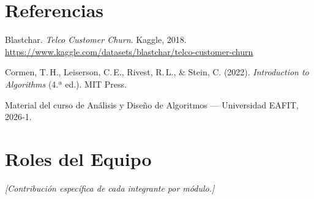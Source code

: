 \documentclass[12pt, a4paper]{article}
\begin{document}
\section{Referencias}

\begin{enumerate}[label={[\arabic*]}]
  \item Blastchar. \textit{Telco Customer Churn}. Kaggle, 2018.
        \url{https://www.kaggle.com/datasets/blastchar/telco-customer-churn}
  \item Cormen, T.\,H., Leiserson, C.\,E., Rivest, R.\,L., \& Stein, C. (2022).
        \textit{Introduction to Algorithms} (4.ª ed.). MIT Press.
  \item Material del curso de Análisis y Diseño de Algoritmos — Universidad EAFIT, 2026-1.
\end{enumerate}

\section{Roles del Equipo}
\textit{[Contribución específica de cada integrante por módulo.]}
\end{document}
